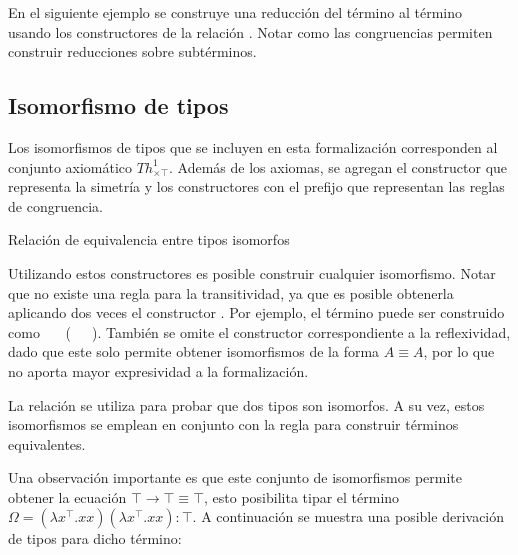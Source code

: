 \begin{example}
	En el siguiente ejemplo se construye una reducción del término  al término ~ usando los constructores de la relación \type{$\_\hookrightarrow\_$}.
	Notar como las congruencias permiten construir reducciones sobre subtérminos.
\end{example}

\subsection{Isomorfismo de tipos}

Los isomorfismos de tipos que se incluyen en esta formalización corresponden al conjunto axiomático $Th^1_{\times\top}$.
Además de los axiomas, se agregan el constructor  que representa la simetría y los constructores con el prefijo  que representan las reglas de congruencia.

\begin{codigo}
	Relación de equivalencia entre tipos isomorfos
	
\end{codigo}
Utilizando estos constructores es posible construir cualquier isomorfismo.
Notar que no existe una regla para la transitividad, ya que es posible obtenerla aplicando dos veces el constructor \const{$[\_]\equiv\_$}.
Por ejemplo, el término \const{[ trans}   \const{]$\equiv$}  puede ser construido como \const{[}~~\const{]$\equiv$}~(\const{[}~~\const{]$\equiv$}~).
También se omite el constructor correspondiente a la reflexividad, dado que este solo permite obtener isomorfismos de la forma $A \equiv A$, por lo que no aporta mayor expresividad a la formalización.

\begin{example}
	La relación \type{$\_\equiv\_$} se utiliza para probar que dos tipos son isomorfos.
	A su vez, estos isomorfismos se emplean en conjunto con la regla \const{$[\_]\equiv\_$} para construir términos equivalentes.
\end{example}

Una observación importante es que este conjunto de isomorfismos permite obtener la ecuación $\top \rightarrow \top \equiv \top$, esto posibilita tipar el término $\Omega = (\lambda x^\top.xx)(\lambda x^\top.xx): \top$.
A continuación se muestra una posible derivación de tipos para dicho término:

